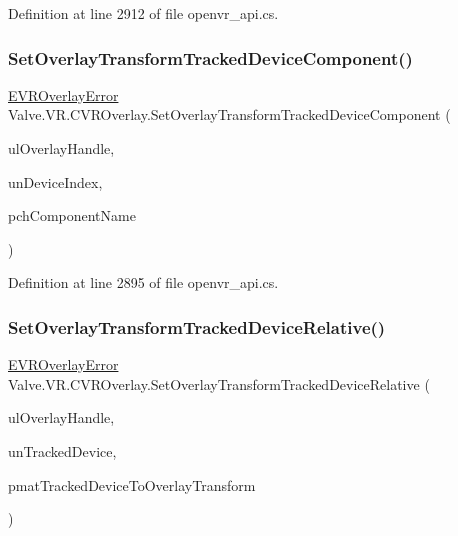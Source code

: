 Definition at line 2912 of file openvr\+\_\+api.\+cs.

\mbox{\label{class_valve_1_1_v_r_1_1_c_v_r_overlay_ac4e364aeb27f4553cc90edf4b3f95837}} 
\subsubsection{\texorpdfstring{SetOverlayTransformTrackedDeviceComponent()}{SetOverlayTransformTrackedDeviceComponent()}}
{\footnotesize\ttfamily \mbox{\hyperlink{namespace_valve_1_1_v_r_aaee5c5144f42b7969d45b854f51b0c18}{E\+V\+R\+Overlay\+Error}} Valve.\+V\+R.\+C\+V\+R\+Overlay.\+Set\+Overlay\+Transform\+Tracked\+Device\+Component (\begin{DoxyParamCaption}\item[{ulong}]{ul\+Overlay\+Handle,  }\item[{uint}]{un\+Device\+Index,  }\item[{string}]{pch\+Component\+Name }\end{DoxyParamCaption})}



Definition at line 2895 of file openvr\+\_\+api.\+cs.

\mbox{\label{class_valve_1_1_v_r_1_1_c_v_r_overlay_aa959512be1624a75d9e44db50e20dcb3}} 
\subsubsection{\texorpdfstring{SetOverlayTransformTrackedDeviceRelative()}{SetOverlayTransformTrackedDeviceRelative()}}
{\footnotesize\ttfamily \mbox{\hyperlink{namespace_valve_1_1_v_r_aaee5c5144f42b7969d45b854f51b0c18}{E\+V\+R\+Overlay\+Error}} Valve.\+V\+R.\+C\+V\+R\+Overlay.\+Set\+Overlay\+Transform\+Tracked\+Device\+Relative (\begin{DoxyParamCaption}\item[{ulong}]{ul\+Overlay\+Handle,  }\item[{uint}]{un\+Tracked\+Device,  }\item[{ref \mbox{\hyperlink{struct_valve_1_1_v_r_1_1_hmd_matrix34__t}{Hmd\+Matrix34\+\_\+t}}}]{pmat\+Tracked\+Device\+To\+Overlay\+Transform }\end{DoxyParamCaption})}



